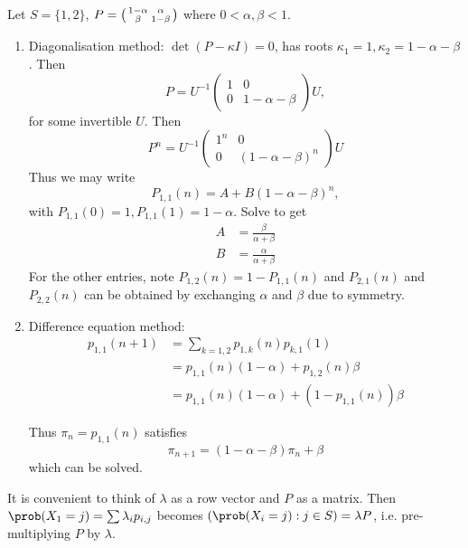 \documentclass[a4paper]{article}
\begin{document}
\begin{eg}
  Let $S = \{1,2\}$, $P=\begin{psmallmatrix} 1-\alpha & \alpha \\ \beta & 1-\beta\end{psmallmatrix}$ where $0<\alpha, \beta < 1$.
  \begin{enumerate}
  \item Diagonalisation method: $\det(P-\kappa I)=0$, has roots $\kappa_1=1,\kappa_2=1-\alpha-\beta$. Then
  \[
    P = U^{-1}
    \begin{pmatrix}
      1 & 0\\
      0 & 1-\alpha-\beta
    \end{pmatrix}U,
  \]
  for some invertible $U$. Then
  \[
    P^n = U^{-1}
    \begin{pmatrix}
      1^n & 0 \\
      0 & (1-\alpha-\beta)^n
    \end{pmatrix} U
    \]
    Thus we may write
    \[
      P_{1,1}(n) = A+B(1-\alpha-\beta)^n,
    \]
    with $P_{1,1}(0)=1,P_{1,1}(1)=1-\alpha$. Solve to get
    \begin{align*}
      A &= \frac{\beta}{\alpha+\beta} \\
      B &= \frac{\alpha}{\alpha+\beta}
    \end{align*}
    For the other entries, note $P_{1,2}(n)=1-P_{1,1}(n)$ and $P_{2,1}(n)$ and $P_{2,2}(n)$ can be obtained by exchanging $\alpha$ and $\beta$ due to symmetry.

  \item Difference equation method:
    \begin{align*}
      p_{1,1}(n+1) &= \sum_{k=1,2} p_{1,k}(n)p_{k,1}(1) \\
                   &= p_{1,1}(n)(1-\alpha) + p_{1,2}(n)\beta \\
                   &= p_{1,1}(n)(1-\alpha) + (1-p_{1,1}(n))\beta
    \end{align*}

    Thus $\pi_{n}=p_{1,1}(n)$ satisfies
    \[
      \pi_{n+1} = (1-\alpha-\beta)\pi_n+\beta
    \]
    which can be solved.
  \end{enumerate}
\end{eg}

It is convenient to think of \(\lambda\) as a row vector and \(P\) as a matrix. Then \(\prob(X_1=j) = \sum \lambda_ip_{i,j}\) becomes \((\prob(X_i=j):j\in S) = \lambda P\), i.e. pre-multiplying \(P\) by \(\lambda\).
\end{document}
